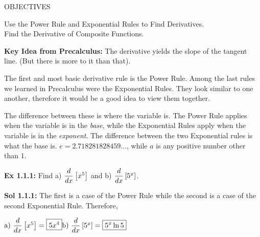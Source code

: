 \begin{tcolorbox}[objective]
    \begin{center}
        OBJECTIVES \\[11pt]
    \end{center}
    Use the Power Rule and Exponential Rules to Find Derivatives. \\
    Find the Derivative of Composite Functions. 
\end{tcolorbox}



\textbf{Key Idea from Precalculus:} The derivative yields the slope of the tangent line. (But there is more to it than that). \par
The first and most basic derivative rule is the Power Rule. Among the last rules we learned in Precalculus were the Exponential Rules. They look similar to one another, therefore it would be a good idea to view them together. 


\begin{center}
\end{center}


The difference between these is where the variable is. The Power Rule applies when the variable is in the \textit{base}, while the Exponential Rules apply when the variable is in the \textit{exponent}. The difference between the two Exponential rules is what the base is. $e = 2.718281828459 \dots$, while $a$ is any positive number other than $1$. \par 


\begin{tcolorbox}[example]
    \textbf{Ex 1.1.1: } Find a) $\dfrac{d}{dx} \left[x^5\right]$ and b) $\dfrac{d}{dx} \left[5^x\right]$. 
\end{tcolorbox} 
\begin{tcolorbox}[solution]
    \textbf{Sol 1.1.1: } The first is a case of the Power Rule while the second is a case of the second Exponential Rule. Therefore, \\
\begin{center}
$\hfill \text{a) } \diff \left[x^5\right] = \boxed{5x^4} \hfill \text{b) } \diff \left[5^x\right] = \boxed{5^x \ln{5}} \hfill$
\end{center} 
\end{tcolorbox} \vspace{11pt}


